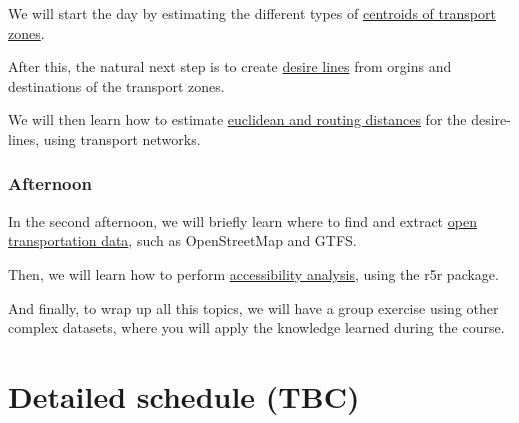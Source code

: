 \documentclass[
  letterpaper,
  DIV=11,
  numbers=noendperiod]{scrreprt}
\begin{document}
We will start the day by estimating the different types of
\href{centroids.qmd}{centroids of transport zones}.

After this, the natural next step is to create
\href{desire-lines.qmd}{desire lines} from orgins and destinations of
the transport zones.

We will then learn how to estimate \href{distances.qmd}{euclidean and
routing distances} for the desire-lines, using transport networks.

\subsection*{Afternoon}\label{afternoon-1}

In the second afternoon, we will briefly learn where to find and extract
\href{open-data.qmd}{open transportation data}, such as OpenStreetMap
and GTFS.

Then, we will learn how to perform \href{r5r.qmd}{accessibility
analysis}, using the r5r package.

And finally, to wrap up all this topics, we will have a group exercise
using other complex datasets, where you will apply the knowledge learned
during the course.


\chapter{Detailed schedule (TBC)}\label{detailed-schedule-tbc}
\end{document}
